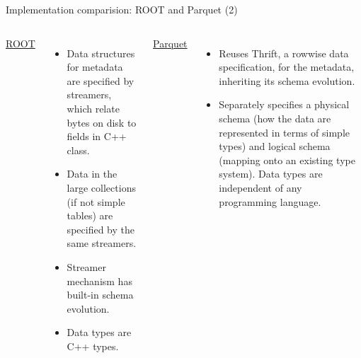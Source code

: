 \documentclass[aspectratio=169]{beamer}
\begin{document}
\begin{frame}{Implementation comparision: ROOT and Parquet (2)}
\vspace{0.5 cm}
\begin{columns}[t]
{\large \underline{ROOT}}

\begin{itemize}
\item Data structures for metadata are specified by streamers, which relate bytes on disk to fields in C++ class.

\item Data in the large collections (if not simple tables) are specified by the same streamers.

\item Streamer mechanism has built-in schema evolution.

\item Data types are C++ types.
\end{itemize}

{\large \underline{Parquet}}

\begin{itemize}
\item Reuses Thrift, a rowwise data specification, for the metadata, inheriting its schema evolution.

\item Separately specifies a physical schema (how the data are represented in terms of simple types) and logical schema (mapping onto an existing type system). Data types are independent of any programming language.
\end{itemize}
\end{columns}
\end{frame}
\end{document}

